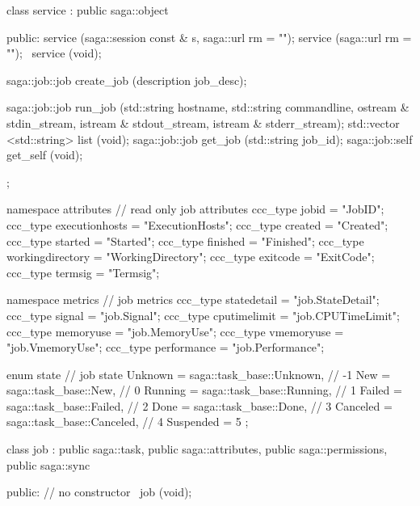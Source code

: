 \begin{mycode}[label=Prototypes: saga::job]
{{  
      class service 
          : public saga::object
      {
        public:
          service  (saga::session const & s, 
                    saga::url             rm = "");
          service  (saga::url             rm = "");
         ~service  (void);
  
          saga::job::job create_job (description job_desc);
  
          saga::job::job run_job    (std::string   hostname,
                                     std::string   commandline,
                                     ostream     & stdin_stream, 
                                     istream     & stdout_stream, 
                                     istream     & stderr_stream);
          std::vector <std::string> 
                          list      (void); 
          saga::job::job  get_job   (std::string   job_id); 
          saga::job::self get_self  (void);
      };
  
  
      namespace attributes 
      {
        //  read only job attributes
        ccc_type jobid            = "JobID";
        ccc_type executionhosts   = "ExecutionHosts";
        ccc_type created          = "Created";
        ccc_type started          = "Started";
        ccc_type finished         = "Finished";
        ccc_type workingdirectory = "WorkingDirectory";
        ccc_type exitcode         = "ExitCode";
        ccc_type termsig          = "Termsig";
      }
  
      namespace metrics 
      { 
        // job metrics
        ccc_type statedetail      = "job.StateDetail";
        ccc_type signal           = "job.Signal";
        ccc_type cputimelimit     = "job.CPUTimeLimit";
        ccc_type memoryuse        = "job.MemoryUse";
        ccc_type vmemoryuse       = "job.VmemoryUse";
        ccc_type performance      = "job.Performance";
      }
  
      enum state 
      {
        // job state
        Unknown   =  saga::task_base::Unknown,   // -1
        New       =  saga::task_base::New,       //  0
        Running   =  saga::task_base::Running,   //  1
        Failed    =  saga::task_base::Failed,    //  2
        Done      =  saga::task_base::Done,      //  3
        Canceled  =  saga::task_base::Canceled,  //  4
        Suspended =  5
      };    
  
      class job : public saga::task,
                  public saga::attributes,
                  public saga::permissions,
                  public saga::sync
      {
        public:
          // no constructor
          ~job (void);

}}}
\end{mycode}
